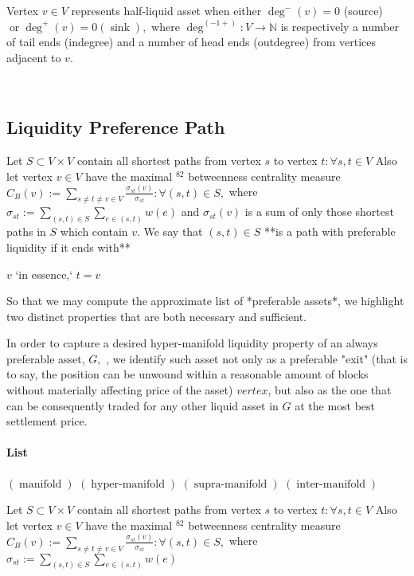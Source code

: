 {{{			
			Vertex $v \in V$ represents half-liquid asset  when either $\operatorname{deg}^{-}(v)=0$ (source) $\operatorname{or} \operatorname{deg}^{+}(v)=0(\operatorname{sink}),$ where $\operatorname{deg}^{(-1+)}: V \rightarrow \mathbb{N}$ is respectively a number
			of tail ends (indegree) and a number of head ends (outdegree) from vertices adjacent to $v$.
			
			\
			\subsection{Liquidity Preference Path}
			
			Let $S \subset V \times V$ contain all shortest paths from vertex $s$ to vertex $t: \forall s, t \in V$ Also let vertex $v \in V$ have the maximal $^{82}$ betweenness centrality measure $C_{B}(v):=\sum_{s \neq t \neq v \in V} \frac{\sigma_{s t}(v)}{\sigma_{s t}}: \forall(s, t) \in S,$ where $\sigma_{s t}:=\sum_{(s, t) \in S} \sum_{e \in(s, t)} w(e)$
			and $\sigma_{s t}(v)$ 
			is a sum of only those shortest paths in $S$ which contain $v .$ We say that $(s, t) \in S$ **is a path with preferable liquidity if it ends with** 
			
			$v$ `in essence,` $t=v$
			
			So that we may compute the approximate list of *preferable assets*, we highlight two distinct properties that are both necessary and sufficient.
			
			In order to capture a desired hyper-manifold liquidity property of an always preferable asset, $G,$ , we identify such asset not only as a preferable "exit" (that is to say, the position can be unwound within a reasonable amount of blocks without materially affecting price of the asset) $vertex$, but also as the one that can be consequently traded for any other liquid asset in $G$ at the most best settlement price.
			
			
			\paragraph{List}
			
			$(\operatorname{manifold})$
			$(\operatorname{hyper-manifold})$
			$(\operatorname{supra-manifold})$
			$(\operatorname{inter-manifold})$
			
			
			Let $S \subset V \times V$ contain all shortest paths from vertex $s$ to vertex $t: \forall s, t \in V$ Also let vertex $v \in V$ have the maximal $^{82}$ betweenness centrality measure $C_{B}(v):=\sum_{s \neq t \neq v \in V} \frac{\sigma_{s t}(v)}{\sigma_{s t}}: \forall(s, t) \in S,$ where $\sigma_{s t}:=\sum_{(s, t) \in S} \sum_{e \in(s, t)} w(e)$
			
}}}
